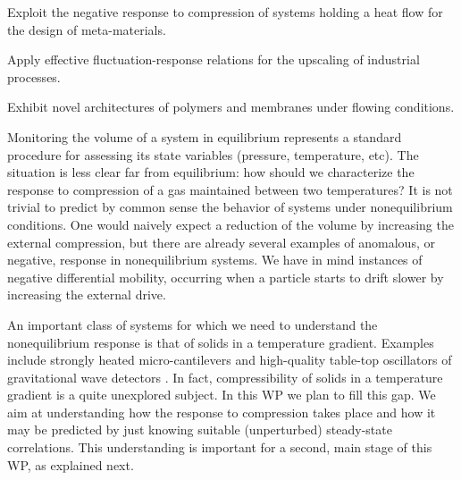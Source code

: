 \begin{workpackage}[id=WPcompress,wphases=0-48,
  short=Nonequilibrium compressibility, %
  title=Nonequilibrium compressibility, %
  lead=UNIPD,
  UNIPDRM=72,
  KULRM=12]

\newrefsection

\begin{wpobjectives}
  \begin{compactitem}
  \item Exploit the negative response to compression of systems holding a heat flow for the design of meta-materials.
  \item Apply effective fluctuation-response relations for the upscaling of industrial processes.
  \item Exhibit novel architectures of polymers and membranes under flowing conditions.
  \end{compactitem}
\end{wpobjectives}

\begin{wpdescription}

Monitoring the volume of a system in equilibrium represents a standard procedure for assessing its state 
variables (pressure, temperature, etc).
The situation is less clear far from equilibrium: 
how should we characterize the response to compression of a gas maintained between two temperatures?
It is not trivial to predict by common sense the behavior of systems under nonequilibrium conditions. 
One would naively expect a reduction of the volume by increasing the external compression, but there are already 
several examples of anomalous, or negative, response in nonequilibrium systems.
We have in mind instances of negative differential mobility, occurring when a particle starts to drift 
slower by increasing the external drive.

An important class of systems for which we need to understand the nonequilibrium response is that of solids 
in a temperature gradient. Examples include strongly
heated micro-cantilevers \cite{AGBB15} and high-quality table-top oscillators of gravitational wave detectors \cite{Cet13}.
In fact, compressibility of solids in a temperature gradient is a quite unexplored subject.
In this WP we plan to fill this gap.
We aim at  understanding how the response to compression takes place and how it
may be predicted by just knowing suitable (unperturbed) steady-state correlations.
This understanding is important for a second, main stage of this WP, as explained next.



\end{wpdescription}
\end{workpackage}
